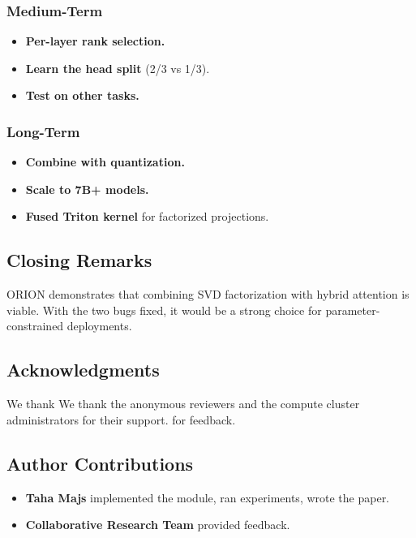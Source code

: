 \subsubsection{Medium-Term}

\begin{itemize}
\item \textbf{Per-layer rank selection.}
\item \textbf{Learn the head split} (2/3 vs 1/3).
\item \textbf{Test on other tasks.}

\end{itemize}
\subsubsection{Long-Term}

\begin{itemize}
\item \textbf{Combine with quantization.}
\item \textbf{Scale to 7B+ models.}
\item \textbf{Fused Triton kernel} for factorized projections.

\end{itemize}
\subsection{Closing Remarks}

ORION demonstrates that combining SVD factorization with hybrid attention 
is viable. With the two bugs fixed, it would be a strong choice for 
parameter-constrained deployments.

\subsection{Acknowledgments}

We thank We thank the anonymous reviewers and the compute cluster administrators for their support. for feedback.

\subsection{Author Contributions}

\begin{itemize}
\item \textbf{Taha Majs} implemented the module, ran experiments, wrote the paper.
\item \textbf{Collaborative Research Team} provided feedback.

\end{itemize}
